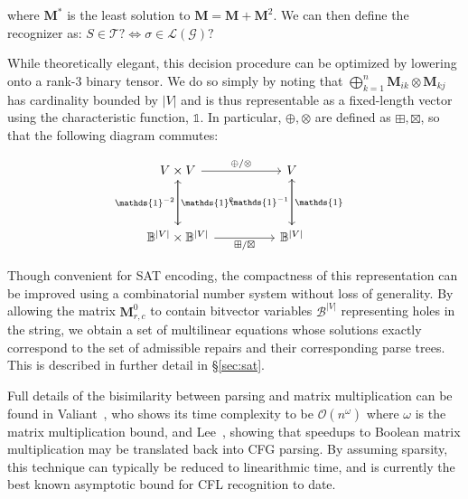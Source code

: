 \documentclass[sigplan,nonacm]{acmart}\settopmatter{printfolios=false,printccs=false,printacmref=false}
\begin{document}
\noindent where $\mathbf{M}^*$ is the least solution to $\mathbf{M} = \mathbf{M} + \mathbf{M}^2$. We can then define the recognizer as: $S \in \mathcal{T}? \iff \sigma \in \mathcal{L}(\mathcal{G})?$ %

While theoretically elegant, this decision procedure can be optimized by lowering onto a rank-3 binary tensor. We do so simply by noting that $\bigoplus_{k = 1}^n \mathbf{M}_{ik} \otimes \mathbf{M}_{kj}$ has cardinality bounded by $|V|$ and is thus representable as a fixed-length vector using the characteristic function, $\mathds{1}$. In particular, $\oplus, \otimes$ are defined as $\boxplus, \boxtimes$, so that the following diagram commutes:

\[\begin{tikzcd}[row sep=huge, column sep=huge]
  V \times V \arrow[r, "\oplus/\otimes"] \arrow[d, "\mathds{1}^2"]
  & V \arrow[d, "\mathds{1}\phantom{^{-1}}"] \\
  \mathbb{B}^{|V|} \times \mathbb{B}^{|V|} \arrow[r, "\boxplus/\boxtimes", labels=below] \arrow[u, "\mathds{1}^{-2}"]
  & \mathbb{B}^{|V|} \arrow[u, "\mathds{1}^{-1}"]
\end{tikzcd}\]

Though convenient for SAT encoding, the compactness of this representation can be improved using a combinatorial number system without loss of generality. By allowing the matrix $\mathbf{M}^0_{r, c}$ to contain bitvector variables $\mathcal{B}^{|V|}$ representing holes in the string, we obtain a set of multilinear equations whose solutions exactly correspond to the set of admissible repairs and their corresponding parse trees. This is described in further detail in \S\ref{sec:sat}.

Full details of the bisimilarity between parsing and matrix multiplication can be found in Valiant~\cite{valiant1975general}, who shows its time complexity to be $\mathcal{O}(n^\omega)$ where $\omega$ is the matrix multiplication bound, and Lee~\cite{lee2002fast}, showing that speedups to Boolean matrix multiplication may be translated back into CFG parsing. By assuming sparsity, this technique can typically be reduced to linearithmic time, and is currently the best known asymptotic bound for CFL recognition to date.
\end{document}
